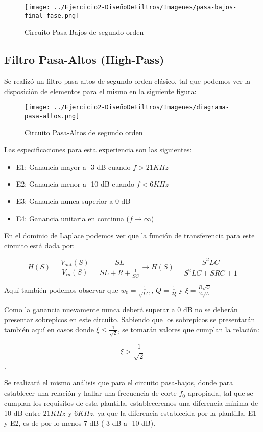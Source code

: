 \begin{figure}[H]
    \centering
    \texttt{[image: ../Ejercicio2-DiseñoDeFiltros/Imagenes/pasa-bajos-final-fase.png]}
    \caption{Circuito Pasa-Bajos de segundo orden}
\end{figure}



\subsection{Filtro Pasa-Altos (High-Pass)}

Se realizó un filtro pasa-altos de segundo orden clásico, tal que podemos
ver la disposición de elementos para el mismo en la siguiente figura:

\begin{figure}[H]
    \centering
    \texttt{[image: ../Ejercicio2-DiseñoDeFiltros/Imagenes/diagrama-pasa-altos.png]}
    \caption{Circuito Pasa-Altos de segundo orden}
\end{figure}

Las especificaciones para esta experiencia son las siguientes:

\begin{itemize}
	\item E1: Ganancia mayor a -3 dB cuando $f > 21 KHz$ 
	\item E2: Ganancia menor a -10 dB cuando $f < 6 KHz $
	\item E3: Ganancia nunca superior a 0 dB
	\item E4: Ganancia unitaria en continua ($f \to \infty$)
\end{itemize}

En el dominio de Laplace podemos ver que la función de transferencia para este circuito está dada por:

$$H(S)=\frac{V_{out}(S)}{V_{in}(S)}=\frac{SL}{SL+R+\frac{1}{SC}} \longrightarrow H(S)=\frac{S^{2}LC}{S^2LC+SRC+1}$$

Aquí también podemos observar que $w_0=\frac{1}{\sqrt{LC}}$, $Q=\frac{1}{2\xi}$ y $\xi=\frac{R\sqrt{C}}{2\sqrt{L}}$

Como la ganancia nuevamente nunca deberá superar a 0 dB no se deberán presentar sobrepicos en este circuito.
Sabiendo que los sobrepicos se presentarán también aquí en casos donde $\xi \leq \frac{1}{\sqrt{2}}$, se tomarán valores que cumplan la relación:

$$\xi > \frac{1}{\sqrt{2}}$$.

Se realizará el mismo análisis que para el circuito pasa-bajos, donde para establecer una relación y hallar una frecuencia de corte $f_0$ apropiada, tal que se cumplan los requisitos
de esta plantilla, estableceremos una diferencia mínima de 10 dB entre $21 KHz$ y $6 KHz$, ya que la diferencia establecida por la plantilla, E1 y E2,
es de por lo menos 7 dB (-3 dB a -10 dB).

